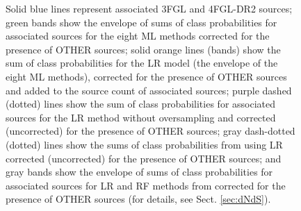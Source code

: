 \documentclass[referee]{aa} %
\begin{document}
\begin{figure}[h]
{Solid blue lines represent associated 3FGL and 4FGL-DR2  sources; green bands show the envelope of sums of class probabilities for associated sources for the eight ML methods corrected for the presence of OTHER sources; solid orange lines (bands) show the sum of class probabilities for the LR model (the envelope of the eight ML methods), corrected for the presence of OTHER sources and added to the source count of associated sources; purple dashed (dotted) lines show the sum of class probabilities for associated sources for the LR method without oversampling and corrected (uncorrected) for the presence of OTHER sources; gray dash-dotted (dotted) lines show the sums of class probabilities from \cite{2016ApJ...820....8S} using LR corrected (uncorrected) for the presence of OTHER sources; and gray bands show the envelope of sums of class probabilities for associated sources for LR and RF methods from \cite{2016ApJ...820....8S} corrected for the presence of OTHER sources (for details, see Sect. \ref{sec:dNdS}).}  
\label{fig:logN_logS}
\end{figure}
\end{document}
